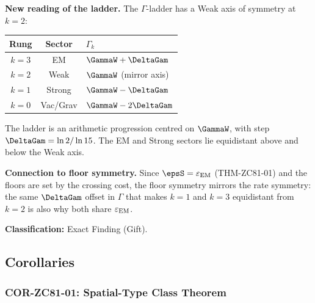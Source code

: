 \documentclass[12pt, a4paper]{article}
\renewcommand{\epsEM}{\varepsilon_{\rm EM}}
\begin{document}
\begin{giftbox}[title={FIND-ZC81-01: Ladder Mirror Symmetry
  ($R_0$, Exact --- Gift)}]
\textbf{New reading of the ladder.}
The $\Gamma$-ladder has a Weak axis of symmetry at $k=2$:
\begin{center}
{\small\renewcommand{\arraystretch}{1.25}
\begin{tabular}{@{}ccl@{}}
\toprule
Rung & Sector & $\Gamma_k$ \\
\midrule
$k=3$ & EM       & $\GammaW + \DeltaGam$ \\
$k=2$ & Weak     & $\GammaW$ (mirror axis) \\
$k=1$ & Strong   & $\GammaW - \DeltaGam$ \\
$k=0$ & Vac/Grav & $\GammaW - 2\DeltaGam$ \\
\bottomrule
\end{tabular}}
\end{center}
The ladder is an arithmetic progression centred on $\GammaW$,
with step $\DeltaGam = \ln 2/\ln 15$. The EM and Strong sectors
lie equidistant above and below the Weak axis.

\textbf{Connection to floor symmetry.}
Since $\epsS = \epsEM$ (THM-ZC81-01) and the floors are set by
the crossing cost, the floor symmetry mirrors the rate symmetry:
the same $\DeltaGam$ offset in $\Gamma$ that makes $k=1$ and
$k=3$ equidistant from $k=2$ is also why both share $\epsEM$.

\textbf{Classification:} Exact Finding (Gift).
\end{giftbox}

\subsection{Corollaries}
\label{sec:cors}

\subsubsection{COR-ZC81-01: Spatial-Type Class Theorem}
\end{document}
